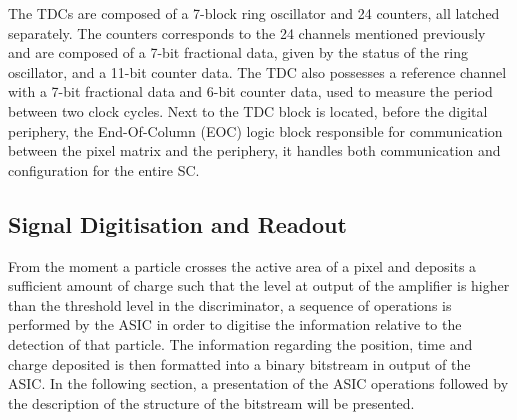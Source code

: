 			The TDCs are composed of a 7-block ring oscillator and 24 counters, all latched separately. The counters corresponds to the 24 channels mentioned previously and are composed of a 7-bit fractional data, given by the status of the ring oscillator, and a 11-bit counter data. The TDC also possesses a reference channel with a 7-bit fractional data and 6-bit counter data, used to measure the period between two clock cycles.
			Next to the TDC block is located, before the digital periphery, the End-Of-Column (EOC) logic block responsible for communication between the pixel matrix and the periphery, it handles both communication and configuration for the entire SC.   
		
		\subsection{Signal Digitisation and Readout}
		From the moment a particle crosses the active area of a pixel and deposits a sufficient amount of charge such that the level at output of the amplifier is higher than the threshold level in the discriminator, a sequence of operations is performed by the ASIC in order to digitise the information relative to the detection of that particle. The information regarding the position, time and charge deposited is then formatted into a binary bitstream in output of the ASIC. In the following section, a presentation of the ASIC operations followed by the description of the structure of the bitstream will be presented. 
		
